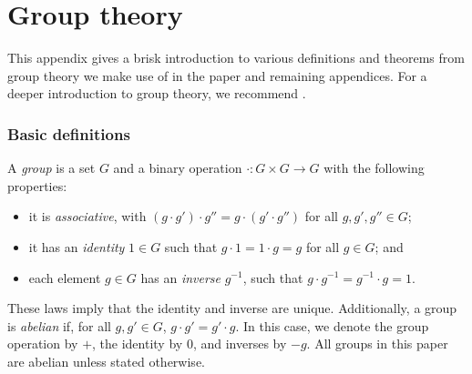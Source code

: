 \documentclass[aps, pre,reprint,nofootinbib,citeautoscript,floatfix]{revtex4-1}
\begin{document}

\newpage
\appendix


\section{Group theory}
\label{sec:group-theory}

This appendix gives a brisk introduction to various definitions and
theorems from group theory we make use of in the paper and remaining
appendices.
For a deeper introduction to group theory, we recommend \cite{algebra,
  Dummit1999AbstractA, lang02}.

\subsubsection*{Basic definitions}
\label{sec:basic-definitions-1}

A \emph{group} is a set $G$ and a binary operation $\cdot: G \times G
\to G$ with the following properties:
\begin{itemize}[itemsep=0pt]
\item it is \emph{associative}, with $(g \cdot g') \cdot g'' = g \cdot (g'\cdot g'')$
  for all $g, g', g'' \in G$;
\item it has an \emph{identity} $1 \in G$ such that $g \cdot 1 = 1
  \cdot g = g$ for all $g\in G$; and
\item each element $g\in G$ has an \emph{inverse} $g^{-1}$, such that $g \cdot g^{-1} = g^{-1}\cdot g = 1$.
\end{itemize}
These laws imply that the identity and inverse are unique.
Additionally, a group is \emph{abelian} if, for
all $g, g' \in G$, $g \cdot g' = g' \cdot g$.
In this case, we denote the group operation by $+$, the identity by
$0$, and inverses by $-g$.
All groups in this paper are abelian unless stated otherwise.
\end{document}
